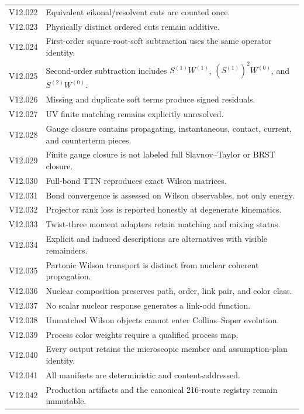\documentclass[11pt]{article}
\begin{document}
\begin{longtable}{L{0.17\textwidth}L{0.75\textwidth}}
V12.022 & Equivalent eikonal/resolvent cuts are counted once.\\
V12.023 & Physically distinct ordered cuts remain additive.\\
V12.024 & First-order square-root-soft subtraction uses the same operator identity.\\
V12.025 & Second-order subtraction includes \(S^{(1)}W^{(1)}\), \((S^{(1)})^2W^{(0)}\), and \(S^{(2)}W^{(0)}\).\\
V12.026 & Missing and duplicate soft terms produce signed residuals.\\
V12.027 & UV finite matching remains explicitly unresolved.\\
V12.028 & Gauge closure contains propagating, instantaneous, contact, current, and counterterm pieces.\\
V12.029 & Finite gauge closure is not labeled full Slavnov--Taylor or BRST closure.\\
V12.030 & Full-bond TTN reproduces exact Wilson matrices.\\
V12.031 & Bond convergence is assessed on Wilson observables, not only energy.\\
V12.032 & Projector rank loss is reported honestly at degenerate kinematics.\\
V12.033 & Twist-three moment adapters retain matching and mixing status.\\
V12.034 & Explicit and induced descriptions are alternatives with visible remainders.\\
V12.035 & Partonic Wilson transport is distinct from nuclear coherent propagation.\\
V12.036 & Nuclear composition preserves path, order, link pair, and color class.\\
V12.037 & No scalar nuclear response generates a link-odd function.\\
V12.038 & Unmatched Wilson objects cannot enter Collins--Soper evolution.\\
V12.039 & Process color weights require a qualified process map.\\
V12.040 & Every output retains the microscopic member and assumption-plan identity.\\
V12.041 & All manifests are deterministic and content-addressed.\\
V12.042 & Production artifacts and the canonical 216-route registry remain immutable.\\
\bottomrule
\end{longtable}
\end{document}
